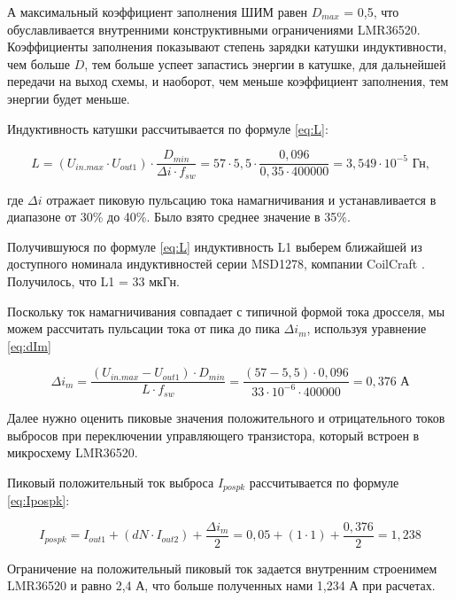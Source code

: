 А максимальный коэффициент заполнения ШИМ равен $D_{max}$ = 0,5, что обуславливается внутренними
конструктивными ограничениями LMR36520. Коэффициенты заполнения показывают степень зарядки 
катушки индуктивности, чем больше $D$, тем больше успеет запастись энергии в катушке, для дальнейшей
передачи на выход схемы, и наоборот, чем меньше коэффициент заполнения, тем энергии будет меньше. 

Индуктивность катушки рассчитывается по формуле \ref{eq:L}:

\begin{equation}
    L =
    (U_{in. max} \cdot U_{out1}) \cdot \frac{D_{min}}{\Delta i \cdot f_{sw}} = 
    57 \cdot 5,5 \cdot \frac{0,096}{0,35 \cdot 400000} =
     3,549 \cdot 10^{-5}  \text{ Гн,}
    \label{eq:L}
\end{equation}

где $\Delta i$ отражает пиковую пульсацию тока намагничивания и устанавливается
в диапазоне от 30\% до 40\%. Было взято среднее значение в 35\%. 

Получившуюся по формуле \ref{eq:L} индуктивность L1 выберем ближайшей из доступного номинала 
индуктивностей серии MSD1278, компании CoilCraft \cite{MSD1278:datasheet}. Получилось, что L1 = 33 мкГн. 

Поскольку ток намагничивания совпадает с типичной формой тока дросселя, мы можем рассчитать пульсации 
тока от пика до пика $\varDelta i_{m}$, используя уравнение \ref{eq:dIm}

\begin{equation}
    \varDelta i_{m} =
    \frac{(U_{in.max} - U_{out1}) \cdot D_{min}}{L \cdot f_{sw}} =
    \frac{(57 - 5,5) \cdot 0,096}{33 \cdot 10^{-6} \cdot 400000} =
    0,376 \text{ А}
    \label{eq:dIm}
\end{equation}

Далее нужно оценить пиковые значения положительного и отрицательного токов выбросов при переключении
управляющего транзистора, который встроен в микросхему LMR36520. 

Пиковый положительный ток выброса $I_{pospk}$ рассчитывается по формуле \ref{eq:Ipospk}:

\begin{equation}
    I_{pospk} =
    I_{out1} + (dN \cdot I_{out2}) + \frac{\Delta i_{m}}{2} = 
    0,05 + (1 \cdot 1) + \frac{0,376}{2} =
    1,238
    \label{eq:Ipospk}
\end{equation}

Ограничение на положительный пиковый ток задается внутренним строенимем LMR36520 и равно 2,4 А, что больше
полученных нами 1,234 А при расчетах. 


